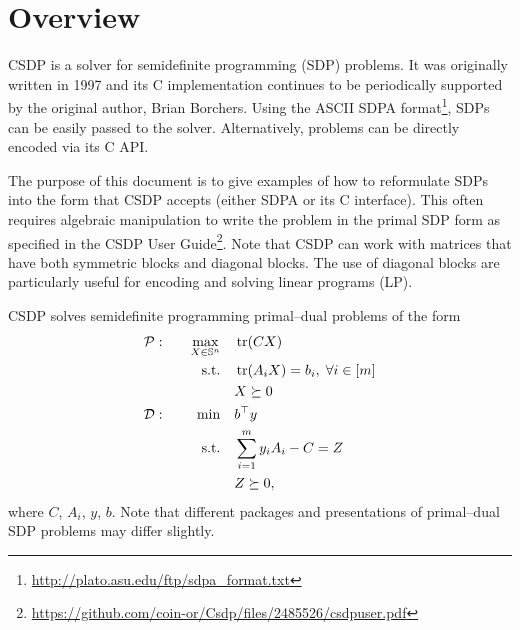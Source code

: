 \documentclass[a4paper]{article}
\begin{document}
\section*{Overview}
CSDP is a solver for semidefinite programming (SDP) problems.
It was originally written in 1997 and its C implementation continues to be periodically supported by the original author, Brian Borchers.
Using the ASCII SDPA format\footnote{\url{http://plato.asu.edu/ftp/sdpa_format.txt}}, SDPs can be easily passed to the solver.
Alternatively, problems can be directly encoded via its C API.

The purpose of this document is to give examples of how to reformulate SDPs into the form that CSDP accepts (either SDPA or its C interface).
This often requires algebraic manipulation to write the problem in the primal SDP form as specified in the CSDP User Guide\footnote{\url{https://github.com/coin-or/Csdp/files/2485526/csdpuser.pdf}}.
Note that CSDP can work with matrices that have both symmetric blocks and diagonal blocks.
The use of diagonal blocks are particularly useful for encoding and solving linear programs (LP).

CSDP solves semidefinite programming primal--dual problems of the form
\begin{equation*}
\begin{aligned}
\mathcal{P}: \quad && \max_{X\in\mathbb{S}^n}          \quad & \tr(CX) \\
                   && \textrm{s.t.} \quad & \tr(A_iX) = b_i, \;\forall i\in[m] \\
                   &&                     & X \succeq 0 \\
\mathcal{D}: \quad && \min          \quad & b^\top y \\
                   && \textrm{s.t.} \quad & \sum_{i=1}^m y_i A_i - C = Z\\
                   &&                     & Z \succeq 0,
\end{aligned}
\end{equation*}
where $C$, $A_i$, $y$, $b$.
Note that different packages and presentations of primal--dual SDP problems may differ slightly.







\end{document}
